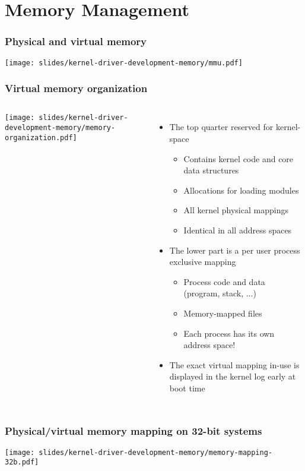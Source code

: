 \section{Memory Management}

\begin{frame}
  \frametitle{Physical and virtual memory}
  \begin{center}
    \texttt{[image: slides/kernel-driver-development-memory/mmu.pdf]}
  \end{center}
\end{frame}

\begin{frame}
  \frametitle{Virtual memory organization}
  \begin{columns}
    \texttt{[image: slides/kernel-driver-development-memory/memory-organization.pdf]}
    \begin{itemize}
    \item The top quarter reserved for kernel-space
      \begin{itemize}
      \item Contains kernel code and core data structures
      \item Allocations for loading modules
      \item All kernel physical mappings
      \item Identical in all address spaces
      \end{itemize}
    \item The lower part is a per user process exclusive mapping
      \begin{itemize}
      \item Process code and data (program, stack, ...)
      \item Memory-mapped files
      \item Each process has its own address space!
      \end{itemize}
    \item The exact virtual mapping in-use is displayed in the kernel log
      early at boot time
    \end{itemize}
  \end{columns}
\end{frame}

\begin{frame}
  \frametitle{Physical/virtual memory mapping on 32-bit systems}
  \begin{center}
    \texttt{[image: slides/kernel-driver-development-memory/memory-mapping-32b.pdf]}
  \end{center}
\end{frame}

